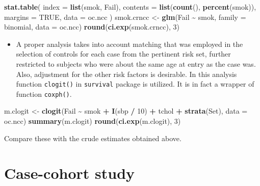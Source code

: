 \documentclass[
]{book}
\newenvironment{Shaded}{\begin{snugshade}}{\end{snugshade}}
\newcommand{\AttributeTok}[1]{\textcolor[rgb]{0.13,0.29,0.53}{#1}}
\newcommand{\ConstantTok}[1]{\textcolor[rgb]{0.56,0.35,0.01}{#1}}
\newcommand{\DecValTok}[1]{\textcolor[rgb]{0.00,0.00,0.81}{#1}}
\newcommand{\FunctionTok}[1]{\textcolor[rgb]{0.13,0.29,0.53}{\textbf{#1}}}
\newcommand{\NormalTok}[1]{#1}
\newcommand{\OtherTok}[1]{\textcolor[rgb]{0.56,0.35,0.01}{#1}}
\newcommand{\SpecialCharTok}[1]{\textcolor[rgb]{0.81,0.36,0.00}{\textbf{#1}}}
\providecommand{\tightlist}{%
  \setlength{\itemsep}{0pt}\setlength{\parskip}{0pt}}
\begin{document}
\begin{Shaded}
\begin{Highlighting}[]
\FunctionTok{stat.table}\NormalTok{(}
  \AttributeTok{index =} \FunctionTok{list}\NormalTok{(smok, Fail),}
  \AttributeTok{contents =} \FunctionTok{list}\NormalTok{(}\FunctionTok{count}\NormalTok{(), }\FunctionTok{percent}\NormalTok{(smok)),}
  \AttributeTok{margins =} \ConstantTok{TRUE}\NormalTok{, }
  \AttributeTok{data =}\NormalTok{ oc.ncc}
\NormalTok{)}
\NormalTok{smok.crncc }\OtherTok{\textless{}{-}} \FunctionTok{glm}\NormalTok{(Fail }\SpecialCharTok{\textasciitilde{}}\NormalTok{ smok, }\AttributeTok{family =}\NormalTok{ binomial, }\AttributeTok{data =}\NormalTok{ oc.ncc)}
\FunctionTok{round}\NormalTok{(}\FunctionTok{ci.exp}\NormalTok{(smok.crncc), }\DecValTok{3}\NormalTok{)}
\end{Highlighting}
\end{Shaded}

\begin{itemize}
\tightlist
\item
  A proper analysis takes into account matching that was employed
  in the selection of controls for each case from the
  pertinent risk set, further restricted to
  subjects who were about the same age at entry as the case was.
  Also, adjustment for the other risk factors is desirable.
  In this analysis function \texttt{clogit()} in \texttt{survival} package is
  utilized. It is in fact a wrapper of function \texttt{coxph()}.
\end{itemize}

\begin{Shaded}
\begin{Highlighting}[]
\NormalTok{m.clogit }\OtherTok{\textless{}{-}} \FunctionTok{clogit}\NormalTok{(Fail }\SpecialCharTok{\textasciitilde{}}\NormalTok{ smok }\SpecialCharTok{+} \FunctionTok{I}\NormalTok{(sbp }\SpecialCharTok{/} \DecValTok{10}\NormalTok{) }\SpecialCharTok{+}\NormalTok{ tchol }\SpecialCharTok{+}
  \FunctionTok{strata}\NormalTok{(Set), }\AttributeTok{data =}\NormalTok{ oc.ncc)}
\FunctionTok{summary}\NormalTok{(m.clogit)}
\FunctionTok{round}\NormalTok{(}\FunctionTok{ci.exp}\NormalTok{(m.clogit), }\DecValTok{3}\NormalTok{)}
\end{Highlighting}
\end{Shaded}

Compare these with the crude estimates obtained above.

\section{Case-cohort study}\label{case-cohort-study}
\end{document}
